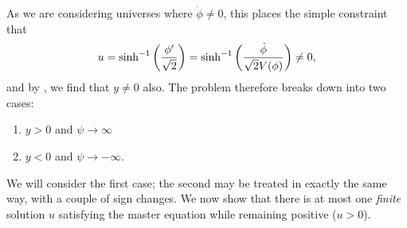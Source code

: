 As we are considering universes where $\dot{\phi}\ne 0$, this places
the simple constraint that 
%
\begin{equation}
  u 
  = 
  \sinh^{-1}\left(\frac{{{\phi}^\prime}}{\sqrt 2}\right) 
  = 
  \sinh^{-1}\left(\frac{\dot\phi}{\sqrt 2 V(\phi)}\right)
  \ne 
  0,
\end{equation}
%
and by , we find that $y\ne0$ also.  The problem
therefore breaks down into two cases: 
%
\begin{enumerate}
  \item $y>0$ and $\psi\rightarrow\infty$
  \item $y<0$ and $\psi\rightarrow -\infty$.
\end{enumerate}
%
We will consider the first case; the second may be treated in exactly
the same way, with a couple of sign changes.  We now show that there
is at most one {\em finite}\/ solution $u$ satisfying the master
equation  while remaining positive ($u>0$).

